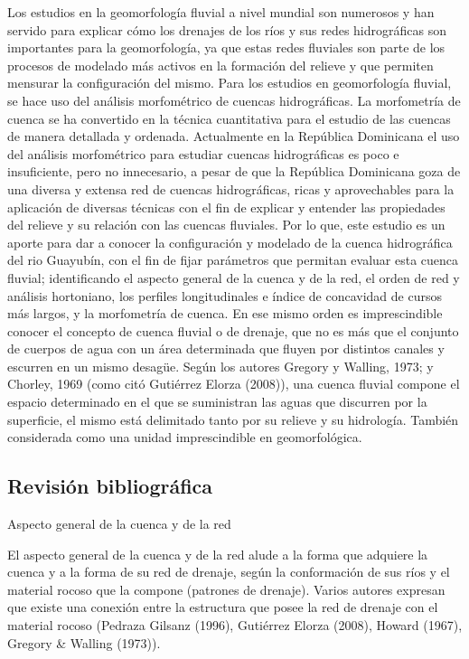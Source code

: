 \documentclass[11pt,]{article}
\begin{document}
Los estudios en la geomorfología fluvial a nivel mundial son numerosos y
han servido para explicar cómo los drenajes de los ríos y sus redes
hidrográficas son importantes para la geomorfología, ya que estas redes
fluviales son parte de los procesos de modelado más activos en la
formación del relieve y que permiten mensurar la configuración del
mismo. Para los estudios en geomorfología fluvial, se hace uso del
análisis morfométrico de cuencas hidrográficas. La morfometría de cuenca
se ha convertido en la técnica cuantitativa para el estudio de las
cuencas de manera detallada y ordenada. Actualmente en la República
Dominicana el uso del análisis morfométrico para estudiar cuencas
hidrográficas es poco e insuficiente, pero no innecesario, a pesar de
que la República Dominicana goza de una diversa y extensa red de cuencas
hidrográficas, ricas y aprovechables para la aplicación de diversas
técnicas con el fin de explicar y entender las propiedades del relieve y
su relación con las cuencas fluviales. Por lo que, este estudio es un
aporte para dar a conocer la configuración y modelado de la cuenca
hidrográfica del rio Guayubín, con el fin de fijar parámetros que
permitan evaluar esta cuenca fluvial; identificando el aspecto general
de la cuenca y de la red, el orden de red y análisis hortoniano, los
perfiles longitudinales e índice de concavidad de cursos más largos, y
la morfometría de cuenca. En ese mismo orden es imprescindible conocer
el concepto de cuenca fluvial o de drenaje, que no es más que el
conjunto de cuerpos de agua con un área determinada que fluyen por
distintos canales y escurren en un mismo desagüe. Según los autores
Gregory y Walling, 1973; y Chorley, 1969 (como citó Gutiérrez Elorza
(2008)), una cuenca fluvial compone el espacio determinado en el que se
suministran las aguas que discurren por la superficie, el mismo está
delimitado tanto por su relieve y su hidrología. También considerada
como una unidad imprescindible en geomorfológica.

\subsection{Revisión bibliográfica}\label{revisiuxf3n-bibliogruxe1fica}

Aspecto general de la cuenca y de la red

El aspecto general de la cuenca y de la red alude a la forma que
adquiere la cuenca y a la forma de su red de drenaje, según la
conformación de sus ríos y el material rocoso que la compone (patrones
de drenaje). Varios autores expresan que existe una conexión entre la
estructura que posee la red de drenaje con el material rocoso (Pedraza
Gilsanz (1996), Gutiérrez Elorza (2008), Howard (1967), Gregory \&
Walling (1973)).
\end{document}
